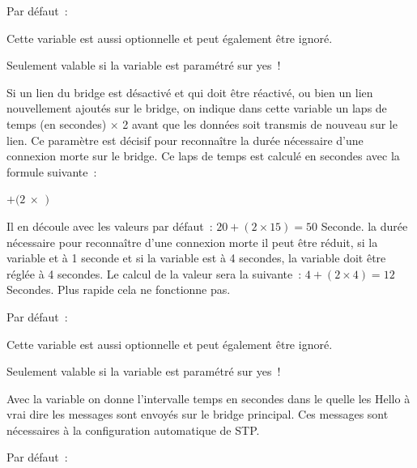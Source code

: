 \begin{description}

  Par défaut~: 

  Cette variable est aussi optionnelle et peut également être ignoré.

  Seulement valable si la variable  est paramétré
  sur yes~!

  Si un lien du bridge est désactivé et qui doit être réactivé, ou bien un lien
  nouvellement ajoutés sur le bridge, on indique dans cette variable un laps de
  temps (en secondes) $\times$ 2 avant que les données soit transmis de nouveau
  sur le lien. Ce paramètre est décisif pour reconnaître la durée nécessaire
  d'une connexion morte sur le bridge. Ce laps de temps est calculé en secondes
  avec la formule suivante~:

  \textbf{$ + (2\ \times$ $)$}

  Il en découle avec les valeurs par défaut~: $20 + (2 \times 15) = 50$ Seconde.
  la durée nécessaire pour reconnaître d'une connexion morte il peut être réduit,
  si la variable  et à 1 seconde et si la variable
   est à 4 secondes, la variable
   doit être réglée à 4 secondes.
  Le calcul de la valeur sera la suivante~: $4 + (2 \times 4) = 12$ Secondes.
  Plus rapide cela ne fonctionne pas.


  Par défaut~: 

  Cette variable est aussi optionnelle et peut également être ignoré.

  Seulement valable si la variable  est paramétré
  sur yes~!

  Avec la variable  on donne l'intervalle temps en
  secondes dans le quelle les Hello à vrai dire les messages sont envoyés sur
  le bridge principal. Ces messages sont nécessaires à la configuration
  automatique de STP.


  Par défaut~: 


\end{description}

